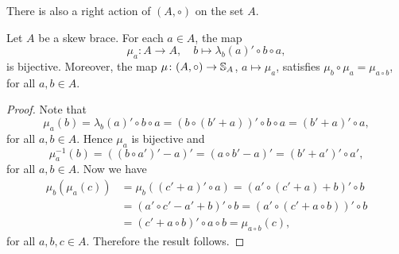 There is also a right action of $(A,\circ)$ on the set $A$.


\begin{proposition}
\label{pro:mu}
    Let $A$ be a skew brace. For each $a\in A$, the map
    \[
        \mu_a\colon A\to A,\quad
        b\mapsto \lambda_b(a)'\circ b\circ a,
    \]
    is bijective. Moreover, the map 
    $\mu\colon (A,\circ)\to\mathbb{S}_A$, $a\mapsto\mu_a$, satisfies $\mu_b\circ\mu_a=\mu_{a\circ b}$, for all $a,b\in A$. 
\end{proposition}

\begin{proof}
    Note that
    \[\mu_a(b)=\lambda_b(a)'\circ b\circ a=(b\circ (b'+a))'\circ b\circ a=(b'+a)'\circ a,\]
    for all $a,b\in A$. Hence $\mu_a$ is bijective and
    \[\mu_a^{-1}(b)=((b\circ a')'-a)'=(a\circ b'-a)'=(b'+a')'\circ a',\]
    for all $a,b\in A$. Now we have
    \begin{align*}
        \mu_b(\mu_a(c))&=\mu_b((c'+a)'\circ a)=(a'\circ (c'+a)+b)'\circ b\\
        &=(a'\circ c'-a'+b)'\circ b=(a'\circ (c'+a\circ b))'\circ b\\
        &=(c'+a\circ b)'\circ a\circ b=\mu_{a\circ b}(c),
    \end{align*}
    for all $a,b,c\in A$. Therefore the result follows.
%    
\end{proof}

